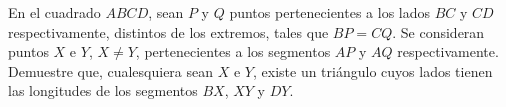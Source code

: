 En el cuadrado $ABCD$, sean $P$ y $Q$ puntos pertenecientes a los lados $BC$ y $CD$ respectivamente, distintos de los extremos, tales que $BP = CQ$. Se consideran puntos $X$ e $Y$, $X \neq Y$, pertenecientes a los segmentos $AP$ y $AQ$ respectivamente. Demuestre que, cualesquiera sean $X$ e $Y$, existe un triángulo cuyos lados tienen las longitudes de los segmentos $BX$, $XY$ y $DY$.
